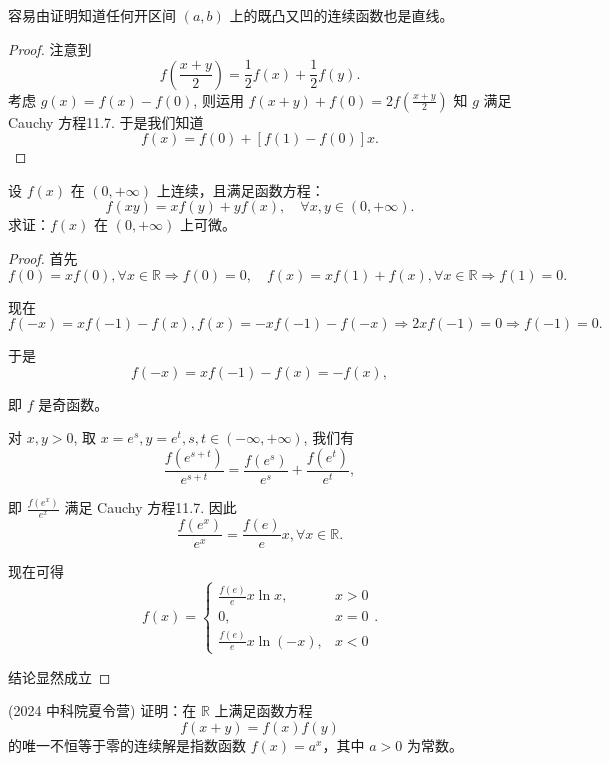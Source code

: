 \documentclass[lang=cn,10pt,thmcnt=section]{elegantbook}
\begin{document}
\begin{remark}
	容易由证明知道任何开区间 $(a, b)$ 上的既凸又凹的连续函数也是直线。
\end{remark}

\begin{proof}
	注意到
\[
f\left(\frac{x+y}{2}\right) = \frac{1}{2}f(x) + \frac{1}{2}f(y).
\]
考虑 $g(x) = f(x) - f(0)$, 则运用 $f(x+y)+f(0) = 2f(\frac{x+y}{2})$ 知 $g$ 满足 Cauchy 方程11.7. 于是我们知道
\[
f(x) = f(0) + [f(1) - f(0)]x.
\]

\end{proof}
\begin{example}
	设 \( f(x) \) 在 \( (0, +\infty) \) 上连续，且满足函数方程：
\[ f(xy) = x f(y) + y f(x), \quad \forall x, y \in (0, +\infty). \]
求证：\( f(x) \) 在 \( (0, +\infty) \) 上可微。
\end{example}
\begin{proof}
	首先
\[
f(0) = xf(0), \forall x \in \mathbb{R} \Rightarrow f(0) = 0, \quad f(x) = xf(1) + f(x), \forall x \in \mathbb{R} \Rightarrow f(1) = 0.
\]

\noindent 现在
\[
f(-x) = xf(-1) - f(x), f(x) = -xf(-1) - f(-x) \Rightarrow 2xf(-1)=0 \Rightarrow f(-1)=0.
\]

\noindent 于是
\[
f(-x) = xf(-1) - f(x) = -f(x),
\]

\noindent 即 $f$ 是奇函数。

\noindent 对 $x, y > 0$, 取 $x=e^s, y=e^t, s, t \in (-\infty, +\infty)$, 我们有
\[
\frac{f(e^{s+t})}{e^{s+t}} = \frac{f(e^s)}{e^s} + \frac{f(e^t)}{e^t},
\]

\noindent 即 $\frac{f(e^x)}{e^x}$ 满足 Cauchy 方程11.7. 因此
\[
\frac{f(e^x)}{e^x} = \frac{f(e)}{e}x, \forall x \in \mathbb{R}.
\]

\noindent 现在可得
\[
f(x) = 
\begin{cases}
    \frac{f(e)}{e} x \ln x, & x > 0 \\
    0, & x=0 \\
    \frac{f(e)}{e} x \ln(-x), & x < 0
\end{cases}.
\]

结论显然成立
\end{proof}
\begin{example}
	(2024 中科院夏令营) 证明：在 \( \mathbb{R} \) 上满足函数方程
\[ f(x+y) = f(x) f(y) \]
的唯一不恒等于零的连续解是指数函数 \( f(x) = a^x \)，其中 \( a > 0 \) 为常数。
\end{example}
\end{document}
